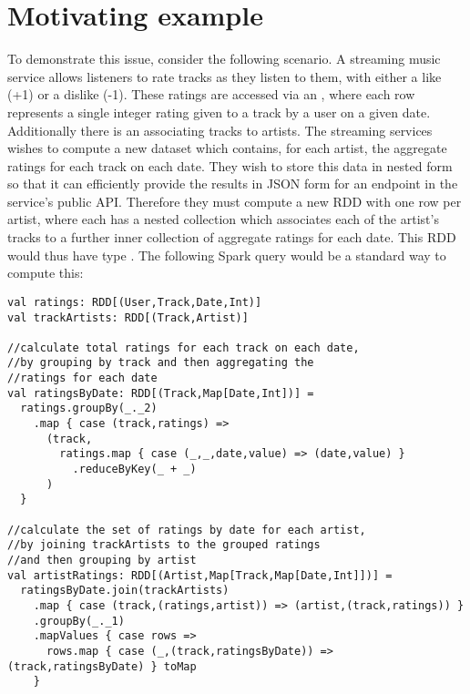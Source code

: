 \section{Motivating example} {

To demonstrate this issue, consider the following scenario. A streaming music service allows listeners to rate tracks as they listen to them, with either a like (+1) or a dislike (-1). These ratings are accessed via an , where each row represents a single integer rating given to a track by a user on a given date. Additionally there is an  associating tracks to artists. The streaming services wishes to compute a new dataset which contains, for each artist, the aggregate ratings for each track on each date. They wish to store this data in nested form so that it can efficiently provide the results in JSON form for an endpoint in the service's public API. Therefore they must compute a new RDD with one row per artist, where each has a nested collection which associates each of the artist's tracks to a further inner collection of aggregate ratings for each date. This RDD would thus have type . The following Spark query would be a standard way to compute this:

\vs\begin{lstlisting}
val ratings: RDD[(User,Track,Date,Int)]
val trackArtists: RDD[(Track,Artist)]

//calculate total ratings for each track on each date,
//by grouping by track and then aggregating the
//ratings for each date
val ratingsByDate: RDD[(Track,Map[Date,Int])] =
  ratings.groupBy(_._2)
    .map { case (track,ratings) =>
      (track,
        ratings.map { case (_,_,date,value) => (date,value) }
          .reduceByKey(_ + _)
      )
  }

//calculate the set of ratings by date for each artist,
//by joining trackArtists to the grouped ratings
//and then grouping by artist
val artistRatings: RDD[(Artist,Map[Track,Map[Date,Int]])] =
  ratingsByDate.join(trackArtists)
    .map { case (track,(ratings,artist)) => (artist,(track,ratings)) }
    .groupBy(_._1)
    .mapValues { case rows =>
      rows.map { case (_,(track,ratingsByDate)) => (track,ratingsByDate) } toMap
    }
\end{lstlisting}\vs

}
